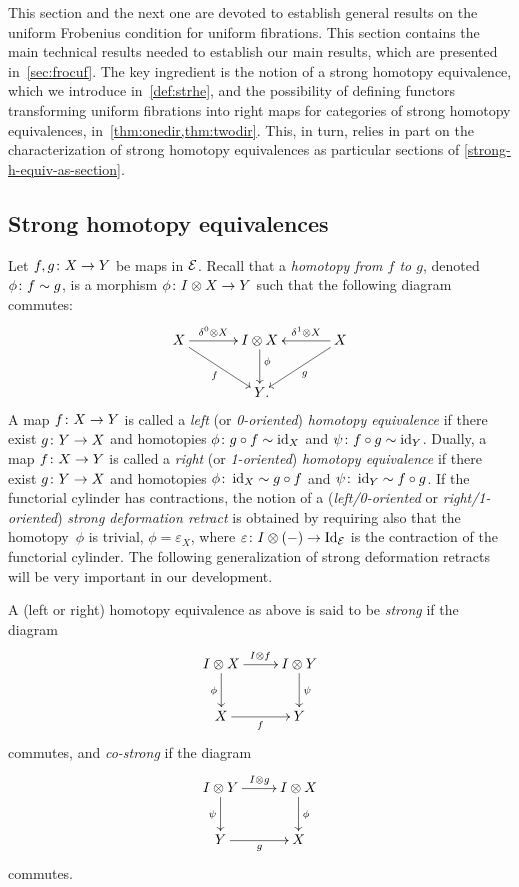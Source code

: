 \documentclass[reqno,10pt,a4paper,oneside,draft]{amsart}
\begin{document}
This section and the next one are devoted to establish general results on
the uniform Frobenius condition for uniform fibrations. 
This section contains the main technical results needed to establish 
our main results, which are presented in~\cref{sec:frocuf}. The key ingredient is the notion of a 
strong homotopy equivalence, which we introduce in~\cref{def:strhe}, and the possibility 
of defining functors transforming uniform fibrations into right maps for  categories of
strong homotopy equivalences, in~\cref{thm:onedir,thm:twodir}. This, in turn, 
relies in part on the characterization of strong homotopy equivalences
 as particular sections of \cref{strong-h-equiv-as-section}. 



\subsection*{Strong homotopy equivalences}
Let $f, g \colon X \to Y$ be maps in $\mathcal{E}$.
Recall that a \emph{homotopy from $f$ to $g$}, denoted $\phi \colon f \sim g$, is a morphism $\phi \colon I \otimes X \to Y$ such that the following diagram commutes:
\begin{equation}
\label{equ:homotopy}
\begin{gathered}
\xymatrix@C=1.2cm{
  X
  \ar[r]^-{\lcyl \otimes X}
  \ar[dr]_{f}
&
  \interval \otimes X
  \ar[d]^(0.4){\phi}
&
  X
  \ar[dl]^{g}
  \ar[l]_-{\rcyl \otimes X}
\\&
  Y
\rlap{.}}
\end{gathered}
\end{equation}
A map $f \colon X \to Y$ is called a \emph{left} (or \emph{0-oriented}) \emph{homotopy equivalence} if there exist $g \colon Y \to X$ and homotopies $\phi \colon g \mathbin{\circ} f \sim \operatorname{id}_X $ and $\psi \colon f \mathbin{\circ} g \sim \operatorname{id}_Y$.
Dually, a map $f \colon X \to Y$ is called a \emph{right} (or \emph{1-oriented}) \emph{homotopy equivalence} if there exist $g \colon Y \to X$ and homotopies $\phi \colon \operatorname{id}_X \sim g \mathbin{\circ} f$ and $\psi \colon \operatorname{id}_Y \sim f \mathbin{\circ} g$.
If the functorial cylinder has contractions, the notion of a (\emph{left/0-oriented} or \emph{right/1-oriented}) \emph{strong deformation retract} is obtained by requiring also that the homotopy~$\phi$ is trivial, \ie $\phi = \varepsilon_X$, where $\varepsilon \colon I \otimes (-)
\to \operatorname{Id}_{\mathcal{E}}$ is the contraction of the functorial cylinder.
The following generalization of strong deformation retracts will be very important in our development.

\begin{definition} \label{def:strhe}
A (left or right) homotopy equivalence as above is said to be \emph{strong} if the diagram
\[
\xymatrix{
  \interval \otimes X
  \ar[r]^{\interval \otimes f}
  \ar[d]_{\phi}
&
  \interval \otimes Y
  \ar[d]^{\psi}
\\
  X
  \ar[r]_{f}
&
  Y
}
\]
commutes, and \emph{co-strong} if the diagram
\[
\xymatrix{
  \interval \otimes Y
  \ar[r]^{\interval \otimes g}
  \ar[d]_{\psi}
&
  \interval \otimes X
  \ar[d]^{\phi}
\\
  Y
  \ar[r]_{g}
&
  X
}
\]
commutes.
\end{definition}
\end{document}
